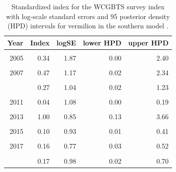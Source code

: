 \documentclass[11pt,
  english,
  a4paper,
]{article}
\begin{document}
\begin{table}

\caption{\label{tab:tab-index-wcgbts}Standardized index for the WCGBTS survey index with log-scale standard errors and 95%
       posterior density (HPD) intervals for vermilion in the southern model .}
\centering
\begin{tabular}[t]{rrrrr}
\toprule
Year & Index & logSE & lower HPD & upper HPD\\
\midrule
\cellcolor{gray!6}{2003} & \cellcolor{gray!6}{0.78} & \cellcolor{gray!6}{1.26} & \cellcolor{gray!6}{0.03} & \cellcolor{gray!6}{4.10}\\
2005 & 0.34 & 1.87 & 0.00 & 2.40\\
\cellcolor{gray!6}{2006} & \cellcolor{gray!6}{0.13} & \cellcolor{gray!6}{1.16} & \cellcolor{gray!6}{0.01} & \cellcolor{gray!6}{0.62}\\
2007 & 0.47 & 1.17 & 0.02 & 2.34\\
\cellcolor{gray!6}{2008} & \cellcolor{gray!6}{0.83} & \cellcolor{gray!6}{1.01} & \cellcolor{gray!6}{0.07} & \cellcolor{gray!6}{3.58}\\
\addlinespace
2009 & 0.27 & 1.04 & 0.02 & 1.23\\
\cellcolor{gray!6}{2010} & \cellcolor{gray!6}{0.19} & \cellcolor{gray!6}{1.01} & \cellcolor{gray!6}{0.02} & \cellcolor{gray!6}{0.79}\\
2011 & 0.04 & 1.08 & 0.00 & 0.19\\
\cellcolor{gray!6}{2012} & \cellcolor{gray!6}{1.81} & \cellcolor{gray!6}{1.46} & \cellcolor{gray!6}{0.04} & \cellcolor{gray!6}{10.72}\\
2013 & 1.00 & 0.85 & 0.13 & 3.66\\
\addlinespace
\cellcolor{gray!6}{2014} & \cellcolor{gray!6}{3.72} & \cellcolor{gray!6}{1.01} & \cellcolor{gray!6}{0.30} & \cellcolor{gray!6}{16.34}\\
2015 & 0.10 & 0.93 & 0.01 & 0.41\\
\cellcolor{gray!6}{2016} & \cellcolor{gray!6}{0.22} & \cellcolor{gray!6}{0.88} & \cellcolor{gray!6}{0.03} & \cellcolor{gray!6}{0.82}\\
2017 & 0.16 & 0.77 & 0.03 & 0.52\\
\cellcolor{gray!6}{2018} & \cellcolor{gray!6}{0.61} & \cellcolor{gray!6}{0.91} & \cellcolor{gray!6}{0.07} & \cellcolor{gray!6}{2.34}\\
\addlinespace
2019 & 0.17 & 0.98 & 0.02 & 0.70\\
\bottomrule
\end{tabular}
\end{table}
\end{document}
